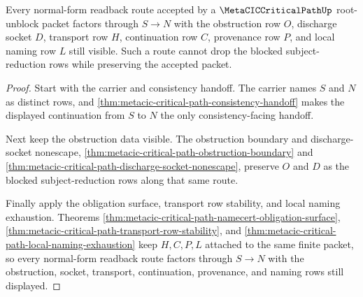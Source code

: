 \begin{theorem}
\label{thm:metacic-critical-path-normal-form-route-coverage}
Every normal-form readback route accepted by a $\MetaCICCriticalPathUp$ root-unblock packet factors through $S \to N$ with the obstruction row $O$, discharge socket $D$, transport row $H$, continuation row $C$, provenance row $P$, and local naming row $L$ still visible. Such a route cannot drop the blocked subject-reduction rows while preserving the accepted packet.
\end{theorem}
\begin{proof}
Start with the carrier and consistency handoff. The carrier names $S$ and $N$ as distinct rows, and \autoref{thm:metacic-critical-path-consistency-handoff} makes the displayed continuation from $S$ to $N$ the only consistency-facing handoff.

Next keep the obstruction data visible. The obstruction boundary and discharge-socket nonescape, \autoref{thm:metacic-critical-path-obstruction-boundary} and \autoref{thm:metacic-critical-path-discharge-socket-nonescape}, preserve $O$ and $D$ as the blocked subject-reduction rows along that same route.

Finally apply the obligation surface, transport row stability, and local naming exhaustion. Theorems \autoref{thm:metacic-critical-path-namecert-obligation-surface}, \autoref{thm:metacic-critical-path-transport-row-stability}, and \autoref{thm:metacic-critical-path-local-naming-exhaustion} keep $H,C,P,L$ attached to the same finite packet, so every normal-form readback route factors through $S \to N$ with the obstruction, socket, transport, continuation, provenance, and naming rows still displayed.
\end{proof}

